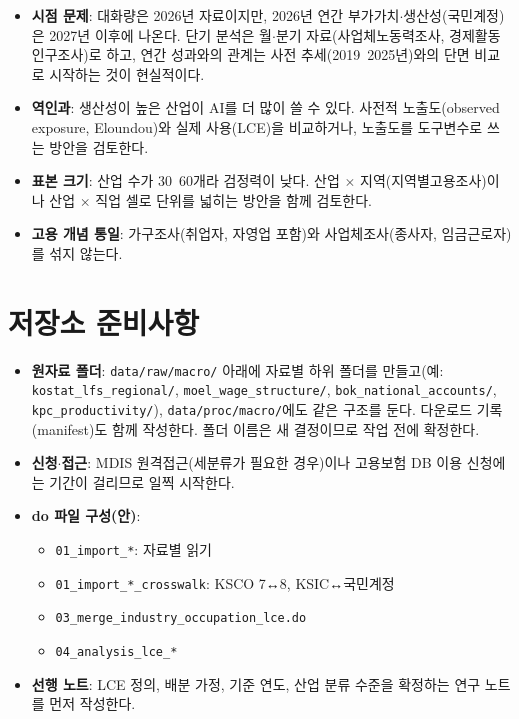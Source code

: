 \documentclass[11pt]{article}
\begin{document}
\begin{itemize}[leftmargin=*]
  \item \textbf{시점 문제}: 대화량은 2026년 자료이지만, 2026년 연간 부가가치$\cdot$생산성(국민계정)은 2027년 이후에 나온다. 단기 분석은 월$\cdot$분기 자료(사업체노동력조사, 경제활동인구조사)로 하고, 연간 성과와의 관계는 사전 추세(2019~2025년)와의 단면 비교로 시작하는 것이 현실적이다.
  \item \textbf{역인과}: 생산성이 높은 산업이 AI를 더 많이 쓸 수 있다. 사전적 노출도(observed exposure, Eloundou)와 실제 사용(LCE)을 비교하거나, 노출도를 도구변수로 쓰는 방안을 검토한다.
  \item \textbf{표본 크기}: 산업 수가 30~60개라 검정력이 낮다. 산업 $\times$ 지역(지역별고용조사)이나 산업 $\times$ 직업 셀로 단위를 넓히는 방안을 함께 검토한다.
  \item \textbf{고용 개념 통일}: 가구조사(취업자, 자영업 포함)와 사업체조사(종사자, 임금근로자)를 섞지 않는다.
\end{itemize}

\section{저장소 준비사항}

\begin{itemize}[leftmargin=*]
  \item \textbf{원자료 폴더}: \texttt{data/raw/macro/} 아래에 자료별 하위 폴더를 만들고(예: \texttt{kostat\_lfs\_regional/}, \texttt{moel\_wage\_structure/}, \texttt{bok\_national\_accounts/}, \texttt{kpc\_productivity/}), \texttt{data/proc/macro/}에도 같은 구조를 둔다. 다운로드 기록(manifest)도 함께 작성한다. 폴더 이름은 새 결정이므로 작업 전에 확정한다.
  \item \textbf{신청$\cdot$접근}: MDIS 원격접근(세분류가 필요한 경우)이나 고용보험 DB 이용 신청에는 기간이 걸리므로 일찍 시작한다.
  \item \textbf{do 파일 구성(안)}:
  \begin{itemize}
    \item \texttt{01\_import\_*}: 자료별 읽기
    \item \texttt{01\_import\_*\_crosswalk}: KSCO 7↔8, KSIC↔국민계정
    \item \texttt{03\_merge\_industry\_occupation\_lce.do}
    \item \texttt{04\_analysis\_lce\_*}
  \end{itemize}
  \item \textbf{선행 노트}: LCE 정의, 배분 가정, 기준 연도, 산업 분류 수준을 확정하는 연구 노트를 먼저 작성한다.
\end{itemize}
\end{document}
